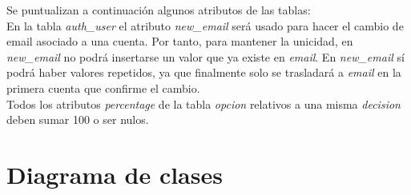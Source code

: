 Se puntualizan a continuación algunos atributos de las tablas: \\

En la tabla \textit{auth\_user} el atributo \textit{new\_email} será usado para hacer el cambio de email asociado a una cuenta. Por tanto, para mantener la unicidad, en \textit{new\_email} no podrá insertarse un valor que ya existe en \textit{email}. En \textit{new\_email} sí podrá haber valores repetidos, ya que finalmente solo se trasladará a \textit{email} en la primera cuenta que confirme el cambio. \\

Todos los atributos \textit{percentage} de la tabla \textit{opcion} relativos a una misma \textit{decision} deben sumar 100 o ser nulos. 

\section{Diagrama de clases}

